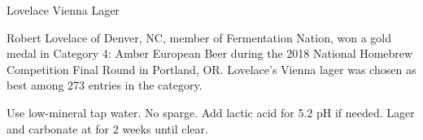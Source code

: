 \begin{recipe}{Lovelace Vienna Lager}

\begin{aboutblock}
Robert Lovelace of Denver, NC, member of Fermentation Nation, won a gold medal in
Category 4: Amber European Beer during the 2018 National Homebrew Competition Final
Round in Portland, OR. Lovelace's Vienna lager was chosen as best among 273 entries
in the category. \sourceaha
\end{aboutblock}


\begin{methodandtiming}
 
\begin{mashsteps}
\end{mashsteps}

\begin{fermentationsteps}
\end{fermentationsteps}

\begin{directions}
Use low-mineral tap water. No sparge. Add lactic acid for 5.2 pH if needed. Lager
and carbonate at  for 2 weeks until clear.
\end{directions}

\end{methodandtiming}

\recipebreak

\begin{ingredientsblock}

\begin{malts}
\end{malts}

\begin{hops}
\end{hops}


\end{ingredientsblock}
\end{recipe}

